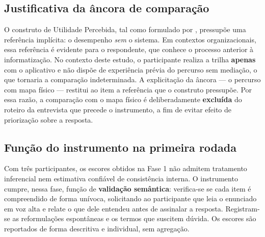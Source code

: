 \subsection{Justificativa da âncora de comparação}

O construto de Utilidade Percebida, tal como formulado por
, pressupõe uma referência implícita: o desempenho
\textit{sem} o sistema. Em contextos organizacionais, essa referência é evidente
para o respondente, que conhece o processo anterior à informatização. No contexto
deste estudo, o participante realiza a trilha \textbf{apenas} com o aplicativo e
não dispõe de experiência prévia do percurso sem mediação, o que tornaria a
comparação indeterminada. A explicitação da âncora --- o percurso com mapa físico
--- restitui ao item a referência que o construto pressupõe. Por essa razão, a
comparação com o mapa físico é deliberadamente \textbf{excluída} do roteiro da
entrevista que precede o instrumento, a fim de evitar efeito de priorização sobre
a resposta.

\subsection{Função do instrumento na primeira rodada}

Com três participantes, os escores obtidos na Fase 1 não admitem tratamento
inferencial nem estimativa confiável de consistência interna. O instrumento cumpre,
nessa fase, função de \textbf{validação semântica}: verifica-se se cada item é
compreendido de forma unívoca, solicitando ao participante que leia o enunciado em
voz alta e relate o que dele entendeu antes de assinalar a resposta. Registram-se
as reformulações espontâneas e os termos que suscitem dúvida. Os escores são
reportados de forma descritiva e individual, sem agregação.

%

